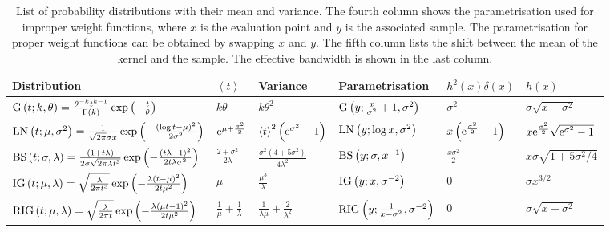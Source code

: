 \begin{table}
\textheight%
\begin{tabular*}{0.9\textheight}{@{\extracolsep{\fill}}llllll}
Distribution & $\left\langle t\right\rangle $ & Variance & Parametrisation & $h^{2}\left(x\right)\delta\left(x\right)$ & $h\left(x\right)$\tabularnewline
\hline 
$\mathrm{G}\left(t;k,\theta\right)=\frac{\theta^{-k}t^{k-1}}{\Gamma(k)}\exp\left(-\frac{t}{\theta}\right)$ & $k\theta$ & $k\theta^{2}$ & $\mathrm{G}\left(y;\frac{x}{\sigma^{2}}+1,\sigma^{2}\right)$ & $\sigma^{2}$ & $\sigma\sqrt{x+\sigma^{2}}$\tabularnewline
$\mathrm{LN}\left(t;\mu,\sigma^{2}\right)=\frac{1}{\sqrt{2\pi}\sigma x}\exp\left(-\frac{\left(\log t-\mu\right)^{2}}{2\sigma^{2}}\right)$ & $\mathrm{e}^{\mu+\frac{\sigma^{2}}{2}}$ & $\left\langle t\right\rangle ^{2}\left(\mathrm{e}^{\sigma^{2}}-1\right)$ & $\mathrm{LN}\left(y;\log x,\sigma^{2}\right)$ & $x\left(\mathrm{e}^{\frac{\sigma^{2}}{2}}-1\right)$ & $x\mathrm{e}^{\frac{\sigma^{2}}{2}}\sqrt{\mathrm{e}^{\sigma^{2}}-1}$\tabularnewline
$\mathrm{BS}\left(t;\sigma,\lambda\right)=\frac{(1+t\lambda)}{2\sigma\sqrt{2\pi\lambda t^{3}}}\exp\left(-\frac{(t\lambda-1)^{2}}{2t\lambda\sigma^{2}}\right)$ & $\frac{2+\sigma^{2}}{2\lambda}$ & $\frac{\sigma^{2}\left(4+5\sigma^{2}\right)}{4\lambda^{2}}$ & $\mathrm{BS}\left(y;\sigma,x^{-1}\right)$ & $\frac{x\sigma^{2}}{2}$ & $x\sigma\sqrt{1+5\sigma^{2}/4}$\tabularnewline
$\mathrm{IG}\left(t;\mu,\lambda\right)=\sqrt{\frac{\lambda}{2\pi t^{3}}}\exp\left(-\frac{\lambda(t-\mu)^{2}}{2t\mu^{2}}\right)$ & $\mu$ & $\frac{\mu^{3}}{\lambda}$ & $\mathrm{IG}\left(y;x,\sigma^{-2}\right)$ & 0 & $\sigma x^{3/2}$\tabularnewline
$\mathrm{RIG}\left(t;\mu,\lambda\right)=\sqrt{\frac{\lambda}{2\pi t}}\exp\left(-\frac{\lambda(\mu t-1)^{2}}{2t\mu^{2}}\right)$ & $\frac{1}{\mu}+\frac{1}{\lambda}$ & $\frac{1}{\lambda\mu}+\frac{2}{\lambda^{2}}$ & $\mathrm{RIG}\left(y;\frac{1}{x-\sigma^{2}},\sigma^{-2}\right)$ & 0 & $\sigma\sqrt{x+\sigma^{2}}$\tabularnewline
\end{tabular*}

\vspace{2em}
\caption{\label{tbl:kernels}List of probability distributions with their mean and variance. The fourth column shows the parametrisation used for improper weight functions, where $x$ is the evaluation point and $y$ is the associated sample. The parametrisation for proper weight functions can be obtained by swapping $x$ and $y$. The fifth column lists the shift between the mean of the kernel and the sample. The effective bandwidth is shown in the last column. \finishcaption}



\end{table}
